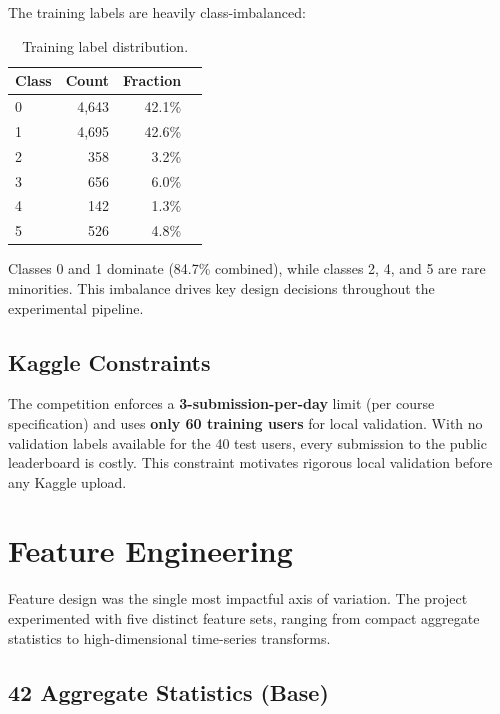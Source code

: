 \documentclass[12pt, a4paper]{article}
\begin{document}
\noindent The training labels are heavily class-imbalanced:

\begin{table}[h]
\centering
\caption{Training label distribution.}
\label{tab:label_dist}
\begin{tabular}{@{}lrrr@{}}
\toprule
\textbf{Class} & \textbf{Count} & \textbf{Fraction} \\ \midrule
0 & 4{,}643 & 42.1\% \\
1 & 4{,}695 & 42.6\% \\
2 & 358 & 3.2\% \\
3 & 656 & 6.0\% \\
4 & 142 & 1.3\% \\
5 & 526 & 4.8\% \\ \bottomrule
\end{tabular}
\end{table}

Classes 0 and 1 dominate (84.7\% combined), while classes 2, 4, and 5 are rare minorities. This imbalance drives key design decisions throughout the experimental pipeline.

\subsection{Kaggle Constraints}

The competition enforces a \textbf{3-submission-per-day} limit (per course specification) and uses \textbf{only 60 training users} for local validation. With no validation labels available for the 40 test users, every submission to the public leaderboard is costly. This constraint motivates rigorous local validation before any Kaggle upload.

\section{Feature Engineering}

Feature design was the single most impactful axis of variation. The project experimented with five distinct feature sets, ranging from compact aggregate statistics to high-dimensional time-series transforms.

\subsection{42 Aggregate Statistics (Base)}
\end{document}
